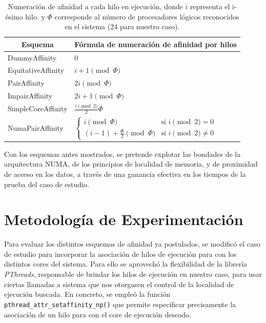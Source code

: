\begin{table}[]
\centering
\begin{tabular}{|l|l|}
\hline
\multicolumn{1}{|c|}{\textbf{Esquema}} & \multicolumn{1}{c|}{\textbf{Fórmula de numeración de afinidad por hilos}}                                  \\ \hline
DummyAffinity                          & 

$\displaystyle 0$
                                                                                            \\ \hline
EquitativeAffinity                     & $\displaystyle i+1 \pmod \Phi $                                                                                 \\ \hline
PairAffinity                           & $\displaystyle 2i \pmod \Phi $                                                                                 \\ \hline
ImpairAffinity                         & $\displaystyle 2i + 1 \pmod \Phi $                                                                               \\ \hline
SimpleCoreAffinity                     & $\displaystyle \frac{i \pmod 2}{2} \Phi$                                                                              
\\ \hline
NumaPairAffinity                       & 
$
\begin{cases}
    \displaystyle i \pmod \Phi & \displaystyle \text{si } i \pmod 2 = 0 \\
    \displaystyle (i-1) + \frac{\Phi}{2} \pmod \Phi & \displaystyle \text{si } i \pmod 2 \neq 0
\end{cases}
$ \\ \hline
\end{tabular}
\caption{Numeración de afinidad a cada hilo en ejecución, donde $i$ representa el i-ésimo hilo. y $\Phi$ corresponde al número de procesadores lógicos reconocidos en el sistema (24 para nuestro caso).}
\label{my-label}
\end{table}

Con los esquemas antes mostrados, se pretende explotar las bondades de la arquitectura NUMA, de los principios de localidad de memoria, y de proximidad de acceso en los datos, a través de una ganancia efectiva en los tiempos de la prueba del caso de estudio.

\section{Metodología de Experimentación}
Para evaluar los distintos esquemas de afinidad ya postulados, se modificó el caso de estudio para incorporar la asociación de hilos de ejecución para con los distintos cores del sistema. Para ello se aprovechó la flexibilidad de la librería \emph{PThreads}, responsable de brindar los hilos de ejecución en nuestro caso, para usar ciertas llamadas a sistema que nos otorgasen el control de la localidad de ejecución buscada. En concreto, se empleó la función \verb=pthread_attr_setaffinity_np()= que permite especificar precisamente la asociación de un hilo para con el core de ejecución deseado. 

